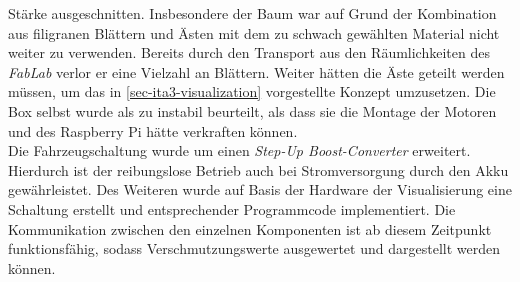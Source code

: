 \documentclass[.../Dokumentation.tex]{subfiles}
\begin{document}
Stärke ausgeschnitten. Insbesondere der Baum war auf Grund der Kombination 
aus filigranen Blättern und Ästen mit dem zu schwach gewählten Material nicht 
weiter zu verwenden. Bereits durch den Transport aus den Räumlichkeiten 
des \textit{FabLab} verlor er eine Vielzahl an Blättern. Weiter hätten die Äste 
geteilt werden müssen, um das in \ref{sec-ita3-visualization} vorgestellte 
Konzept umzusetzen. Die Box selbst wurde als zu instabil beurteilt, als dass sie die Montage der Motoren und des Raspberry Pi hätte verkraften können.\\
Die Fahrzeugschaltung wurde um einen \textit{Step-Up Boost-Converter} erweitert. Hierdurch ist der reibungslose Betrieb auch bei Stromversorgung durch den Akku gewährleistet. Des Weiteren wurde auf Basis der Hardware der Visualisierung eine Schaltung erstellt und entsprechender Programmcode implementiert. Die Kommunikation zwischen den einzelnen Komponenten ist ab diesem Zeitpunkt funktionsfähig, sodass Verschmutzungswerte ausgewertet und dargestellt werden können.
\end{document}
